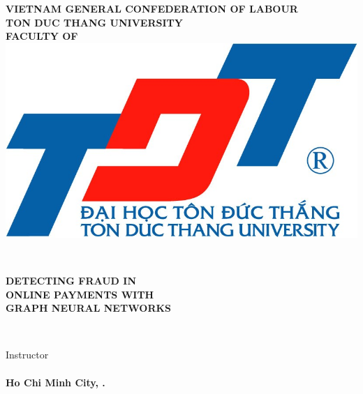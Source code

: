 \begin{center}
	\large{\textbf{VIETNAM GENERAL CONFEDERATION OF LABOUR}} \\
	\large{\textbf{TON DUC THANG UNIVERSITY}} \\
	\large{\textbf{\MakeUppercase{FACULTY OF \khoa}}} \\\vspace*{1cm}	
	\includegraphics[width=0.5\linewidth]{lib/TDTlogo.jpg}\\\vspace*{1cm}	
	
	\large{\textbf{\tacgia}}\\\vspace*{1.5cm}
	
	\LARGE{\textbf{\MakeUppercase{Detecting Fraud in \\ Online Payments with \\Graph Neural Networks}}}\\\vspace*{1.5cm}
	
	\LARGE{\textbf{\MakeUppercase{\chuyennganh}}}\\\vspace*{1.5cm}
	
	\Large{\textbf{\MakeUppercase{\monhoc}}}\vspace*{1.5cm}

	Instructor\\
	\large{\textbf{\gvhd}}\\


	\large{\textbf{Ho Chi Minh City, \nam.}}
\end{center}